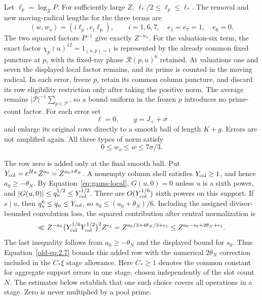 \documentclass[12pt]{article}
\begin{document}
Let \(\ell_p=\log_ZP\).  For sufficiently large \(Z\),
\(\ell_*/2\le\ell_p\le\ell_*\).  The removal and new
moving-radical lengths for the three terms are
\begin{equation}
 (w,w_o)=(i\ell_p,e_i\ell_p),\qquad
 i=1,6,7,\quad e_1=e_7=1,\quad e_6=0.
 \label{old-eq:2.9}
\end{equation}
The two squared factors \(P^{-1}\) give exactly \(Z^{-w_o}\).
For the valuation-six term, the exact factor
\(\chi_p(u)^{12}=1_{(u,p)=1}\) is represented by the already
common fixed puncture at \(p\), with its fixed-ray phase \(\mathcal R(p,u)^6\) retained.
At valuations one and seven the displayed local factor remains, and its
prime is counted in the moving radical.  In each
error, freeze \(p\), retain its common
column puncture, and discard its row eligibility restriction only
after taking the positive norm.  The average remains
\(|\mathcal P|^{-1}\sum_{p\in\mathcal P}\), so a bound uniform in
the frozen \(p\) introduces no prime-count factor.  For each error
set
\[
 \ell=0,\qquad g=J_++\sigma
\]
and enlarge its original rows directly to a smooth ball of length
\(K+g\).  Errors are not amplified again.  All three types of
norm satisfy
\begin{equation}
 0\le w_o\le w\le7\sigma/3.
 \label{old-eq:2.10}
\end{equation}

The row zero is added only at the final smooth ball.  Put
\(Y_{\rm col}=e^{H_N}Z^{a_0}=Z^{a_0+\theta_N}\).  A nonempty column
shell satisfies \(Y_{\rm col}\ge1\), and hence \(a_0\ge-\theta_N\).
By Equation~\eqref{eq:gauss-local}, \(G(u,0)=0\) unless \(u\) is a
sixth power, and \(|G(u,0)|\le q_u^{1/2}\le Y_{\rm col}^{1/2}\).
There are \(O(Y_{\rm col}^{1/6})\) sixth powers on this support.
If \(s\mid u\), then \(q_s^6\le q_u\le Y_{\rm col}\), so
\(s_0\le(a_0+\theta_N)/6\).  Including the assigned divisor-bounded
convolution loss, the squared contribution after central normalization is
\[
 \ll Z^{-a_0}\bigl(Y_{\rm col}^{1/6}Y_{\rm col}^{1/2}\bigr)^2
          Z^{\epsilon_1}
 =Z^{a_0/3+4\theta_N/3+\epsilon_1}
 \le Z^{a_0-s_0+2\theta_N+\epsilon_1}.
\]
The last inequality follows from \(a_0\ge-\theta_N\) and the displayed
bound for \(s_0\).  Thus Equation~\eqref{old-eq:2.7} bounds this added
row with the numerical \(2\theta_N\) correction included in the
\(C_*\xi\) stage allowance.  Here \(C_*\ge1\) denotes the common
constant for aggregate support errors in one stage, chosen independently
of the slot count \(N\).  The estimates below establish that one such
choice covers all operations in a stage.  Zero is never multiplied by a
pool prime.
\end{document}
